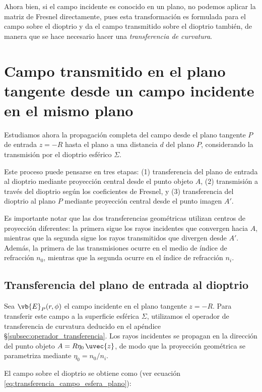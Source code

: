 Ahora bien, si el campo incidente es conocido en un plano, no podemos aplicar la matriz de Fresnel directamente, pues esta transformación es formulada para el campo sobre el dioptrio y da el campo transmitido sobre el dioptrio también, de manera que se hace necesario hacer una \emph{transferencia de curvatura}.



\section[Campo transmitido en plano tangente]{Campo transmitido en el plano tangente desde un campo incidente en el mismo plano}
\label{subsec:campo_plano_a_plano}

Estudiamos ahora la propagación completa del campo desde el plano tangente $P$ de entrada $z = -R$ hasta el plano a una distancia $d$ del plano $P$, considerando la transmisión por el dioptrio esférico $\Sigma$.

Este proceso puede pensarse en tres etapas: (1) transferencia del plano de entrada al dioptrio mediante proyección central desde el punto objeto $A$, (2) transmisión a través del dioptrio según los coeficientes de Fresnel, y (3) transferencia del dioptrio al plano $P$ mediante proyección central desde el punto imagen $A'$.

Es importante notar que las dos transferencias geométricas utilizan centros de proyección diferentes: la primera sigue los rayos incidentes que convergen hacia $A$, mientras que la segunda sigue los rayos transmitidos que divergen desde $A'$. Además, la primera de las transmisiones ocurre en el medio de índice de refracción $n_0$, mientras que la segunda ocurre en el índice de refracción $n_i$.

\subsection{Transferencia del plano de entrada al dioptrio}

Sea $\vb{E}_P(r,\phi)$ el campo incidente en el plano tangente $z = -R$. Para transferir este campo a la superficie esférica $\Sigma$, utilizamos el operador de transferencia de curvatura deducido en el apéndice \S\ref{subsec:operador_transferencia}. Los rayos incidentes se propagan en la dirección del punto objeto $A = R\eta_0\,\uvec{z}$, de modo que la proyección geométrica se parametriza mediante $\eta_0 = n_0/n_i$.

El campo sobre el dioptrio se obtiene como (ver ecuación \eqref{eq:transferencia_campo_esfera_plano}):


